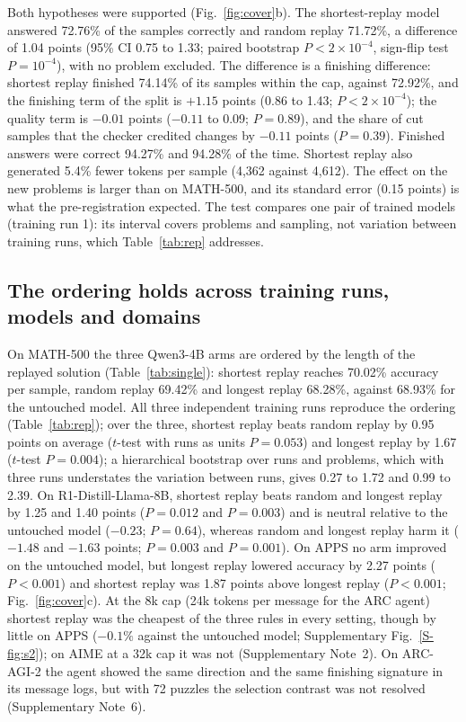\documentclass[10pt]{article}
\newcommand{\sref}[1]{\ref{S-#1}}
\begin{document}
Both hypotheses were supported (Fig.~\ref{fig:cover}b). The shortest-replay model answered 72.76\% of the samples correctly and random replay 71.72\%, a difference of 1.04 points (95\% CI 0.75 to 1.33; paired bootstrap $P<2\times10^{-4}$, sign-flip test $P=10^{-4}$), with no problem excluded. The difference is a finishing difference: shortest replay finished 74.14\% of its samples within the cap, against 72.92\%, and the finishing term of the split is $+1.15$ points (0.86 to 1.43; $P<2\times10^{-4}$); the quality term is $-0.01$ points ($-0.11$ to 0.09; $P=0.89$), and the share of cut samples that the checker credited changes by $-0.11$ points ($P=0.39$). Finished answers were correct 94.27\% and 94.28\% of the time. Shortest replay also generated 5.4\% fewer tokens per sample (4{,}362 against 4{,}612). The effect on the new problems is larger than on MATH-500, and its standard error (0.15 points) is what the pre-registration expected. The test compares one pair of trained models (training run 1): its interval covers problems and sampling, not variation between training runs, which Table~\ref{tab:rep} addresses.

\subsection{The ordering holds across training runs, models and domains}
On MATH-500 the three Qwen3-4B arms are ordered by the length of the replayed solution (Table~\ref{tab:single}): shortest replay reaches 70.02\% accuracy per sample, random replay 69.42\% and longest replay 68.28\%, against 68.93\% for the untouched model. All three independent training runs reproduce the ordering (Table~\ref{tab:rep}); over the three, shortest replay beats random replay by 0.95 points on average ($t$-test with runs as units $P=0.053$) and longest replay by 1.67 ($t$-test $P=0.004$); a hierarchical bootstrap over runs and problems, which with three runs understates the variation between runs, gives 0.27 to 1.72 and 0.99 to 2.39. On R1-Distill-Llama-8B, shortest replay beats random and longest replay by 1.25 and 1.40 points ($P=0.012$ and $P=0.003$) and is neutral relative to the untouched model ($-0.23$; $P=0.64$), whereas random and longest replay harm it ($-1.48$ and $-1.63$ points; $P=0.003$ and $P=0.001$). On APPS no arm improved on the untouched model, but longest replay lowered accuracy by 2.27 points ($P<0.001$) and shortest replay was 1.87 points above longest replay ($P<0.001$; Fig.~\ref{fig:cover}c). At the 8k cap (24k tokens per message for the ARC agent) shortest replay was the cheapest of the three rules in every setting, though by little on APPS ($-0.1\%$ against the untouched model; Supplementary Fig.~\sref{fig:s2}); on AIME at a 32k cap it was not (Supplementary Note~2). On ARC-AGI-2 the agent showed the same direction and the same finishing signature in its message logs, but with 72 puzzles the selection contrast was not resolved (Supplementary Note~6).
\end{document}
